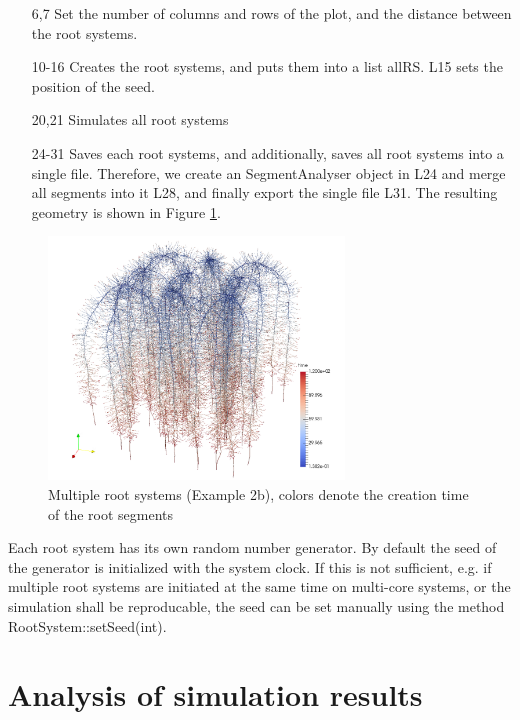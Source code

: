 \documentclass[a4paper]{article}
\begin{document}
\begin{itemize}

\item[6,7] Set the number of columns and rows of the plot, and the distance between the root systems.

\item[10-16] Creates the root systems, and puts them into a list allRS. L15 sets the position of the seed. 

\item[20,21] Simulates all root systems 

\item[24-31] Saves each root systems, and additionally, saves all root systems into a single file. 
Therefore, we create an SegmentAnalyser object in L24 and merge all segments into it L28, and finally export the single file L31. The resulting geometry is shown in Figure \ref{fig:multiple}.

\end{itemize}

\begin{figure}
\centering
\includegraphics[width=0.7\textwidth]{example_2b.png}
\caption{Multiple root systems (Example 2b), colors denote the creation time of the root segments} \label{fig:multiple}
\end{figure}

Each root system has its own random number generator. By default the seed of the generator is initialized with the system clock. 
If this is not sufficient, e.g. if multiple root systems are initiated at the same time on multi-core systems, or the simulation shall be reproducable, the seed can be set manually using the method RootSystem::setSeed(int).




\section{Analysis of simulation results}
\end{document}
